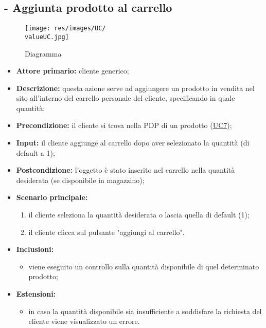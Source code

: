 \subsection{ - Aggiunta prodotto al carrello}
\begin{figure}[H]
    \centering
    \texttt{[image: res/images/UC/\\valueUC.jpg]}
    \caption{Diagramma }
\end{figure}
\begin{itemize}
    \item \textbf{Attore primario:} cliente generico;
    \item \textbf{Descrizione:} questa azione serve ad aggiungere un prodotto in vendita nel sito
          all'interno del carrello personale del cliente, specificando in quale quantità;
    \item \textbf{Precondizione:} il cliente si trova nella PDP di un prodotto (\hyperref[UC7]{UC7});
    \item \textbf{Input:} il cliente aggiunge al carrello dopo aver selezionato la quantità (di default a 1);
    \item \textbf{Postcondizione:} l'oggetto è stato inserito nel carrello nella quantità desiderata (se disponibile in magazzino);
    \item \textbf{Scenario principale:}
          \begin{enumerate}
              \item il cliente seleziona la quantità desiderata o lascia quella di default (1);
              \item il cliente clicca sul pulsante "aggiungi al carrello".
          \end{enumerate}
    \item \textbf{Inclusioni:}
          \begin{itemize}
              \item viene eseguito un controllo sulla quantità disponibile di quel determinato prodotto;
          \end{itemize}
    \item \textbf{Estensioni:}
          \begin{itemize}
              \item in caso la quantità disponibile sia insufficiente a soddisfare la richiesta del cliente viene visualizzato un errore.
          \end{itemize}
\end{itemize}

\stepUserCase
